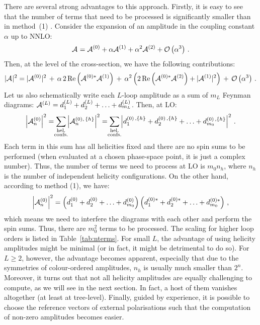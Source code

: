 \documentclass[main.tex]{subfiles}
\begin{document}
There are several strong advantages to this approach. Firstly, it is easy to see that the number of terms that need to be processed is significantly smaller than in method~(1) . Consider the expansion of an amplitude in the coupling constant $\alpha$ up to NNLO:
\begin{equation}
    \mathcal{A}_{}^{} = \mathcal{A}_{}^{(0)} + \alpha \mathcal{A}_{}^{(1)} + \alpha^2 \mathcal{A}_{}^{(2)} + \mathcal{O}\left(\alpha^3\right) \,.
\end{equation}
Then, at the level of the cross-section, we have the following contributions:
\begin{equation}
    |\mathcal{A}_{}^{}|^2 = |\mathcal{A}_{}^{(0)}|^2 \,+\,\alpha\,2\,\mathrm{Re}\left(\mathcal{A}_{}^{(0)\ast}\mathcal{A}_{}^{(1)}\right) \,+\, \alpha^2 \left(2\,\mathrm{Re} \left(\mathcal{A}_{}^{(0)\ast}\mathcal{A}_{}^{(2)}\right) + |\mathcal{A}_{}^{(1)}|^2 \right) \,+\, \mathcal{O}\left(\alpha^3\right)\,.
\end{equation}
Let us also schematically write each $L$-loop amplitude as a sum of $m_L$ Feynman diagrams: $\mathcal{A}_{}^{(L)} = d^{(L)}_1 + d^{(L)}_2 + \ldots + d^{(L)}_{m_L}$. Then, at LO:
\begin{equation}
    \left|\ampl{n}{(0)}\right|^2 = \sum_{\mathclap{\substack{\text{hel.} \\ \text{confs.}}}} \left|\ampl{n}{(0),\,\{h\}} \right|^2 = \sum_{\mathclap{\substack{\text{hel.} \\ \text{confs.}}}} \left|d^{(0)\,,\{h\}}_1 + d^{(0)\,,\{h\}}_2 + \ldots + d^{(0)\,,\{h\}}_{m_0} \right|^2 \,.
\end{equation}
Each term in this sum has all helicities fixed and there are no spin sums to be performed (when evaluated at a chosen phase-space point, it is just a complex number). Thus, the number of terms we need to process at LO is $m_0 n_h$, where $n_h$ is the number of independent helicity configurations. On the other hand, according to method (1), we have:
\begin{equation}
    \left|\mathcal{A}_{n}^{(0)}\right|^2 = \left(d^{(0)}_1 + d^{(0)}_2 + \ldots + d^{(0)}_{m_0} \right) \left(d^{(0)\ast}_1 + d^{(0)\ast}_2 + \ldots + d^{(0)\ast}_{m_0} \right)\,,
\end{equation}
which means we need to interfere the diagrams with each other and perform the spin sums. Thus, there are $m_0^2$ terms to be processed. The scaling for higher loop orders is listed in Table~\ref{tab:nterms}. For small $L$, the advantage of using helicity amplitudes might be minimal (or in fact, it might be detrimental to do so). For $L\geq2$, however, the advantage becomes apparent, especially that due to the symmetries of colour-ordered amplitudes, $n_h$ is usually much smaller than $2^n$. Moreover, it turns out that not all helicity amplitudes are equally challenging to compute, as we will see in the next section. In fact, a host of them vanishes altogether (at least at tree-level). Finally, guided by experience, it is possible to choose the reference vectors of external polarisations such that the computation of non-zero amplitudes becomes easier. 
\end{document}
